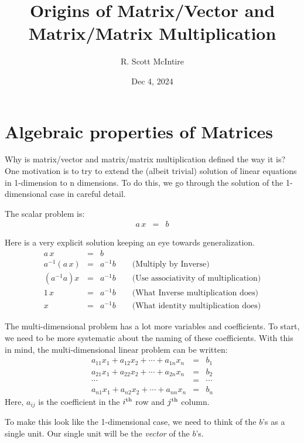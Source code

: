 \documentclass{article}
\title{Origins of Matrix/Vector and Matrix/Matrix Multiplication}
\author{R. Scott McIntire}
\date{Dec 4, 2024}
\begin{document}
\maketitle


\section{Algebraic properties of Matrices}
Why is matrix/vector and matrix/matrix multiplication defined the way it is?
One motivation is to try to extend the (albeit trivial) solution of linear
equations in 1-dimension to n dimensions. To do this, we go through the solution
of the 1-dimensional case in careful detail.

The scalar problem is:
\begin{eqnarray}
  a \, x & = & b \label{scalar-problem}
\end{eqnarray}

Here is a very explicit solution keeping an eye towards generalization.
\begin{eqnarray}
  a \, x & = & b \\
  a^{-1} ( a \, x ) & = & a^{-1} b \quad \quad \text{(Multiply by Inverse)} \label{inv} \\
  (a^{-1} a) x & = & a^{-1} b \quad \quad \text{(Use associativity of multiplication)} \label{assoc} \\
  1 \, x & = & a^{-1} b \quad \quad \text{(What Inverse multiplication does)} \label{inv-mult} \\
  x & = & a^{-1} b \quad \quad \text{(What identity multiplication does)} \label{identity}
\end{eqnarray}

The multi-dimensional problem has a lot more variables and coefficients.
To start, we need to be more systematic about the naming of these coefficients.
With this in mind, the multi-dimensional linear problem can be written:
\begin{eqnarray*}
  a_{11} x_1 + a_{12} x_2 + \cdots + a_{1n} x_n & = & b_1 \\
  a_{21} x_1 + a_{22} x_2 + \cdots + a_{2n} x_n & = & b_2 \\
  \cdots & = & \cdots \\
  a_{n1} x_1 + a_{n2} x_2 + \cdots + a_{nn} x_n & = & b_n 
\end{eqnarray*}
Here, $a_{ij}$ is the coefficient in the $i^{\rm th}$ row and $j^{\rm th}$ column.


To make this look like the 1-dimensional case, we need to think of the $b$'s as
a single unit. Our single unit will be the {\em vector\/} of the $b$'s.
\end{document}
